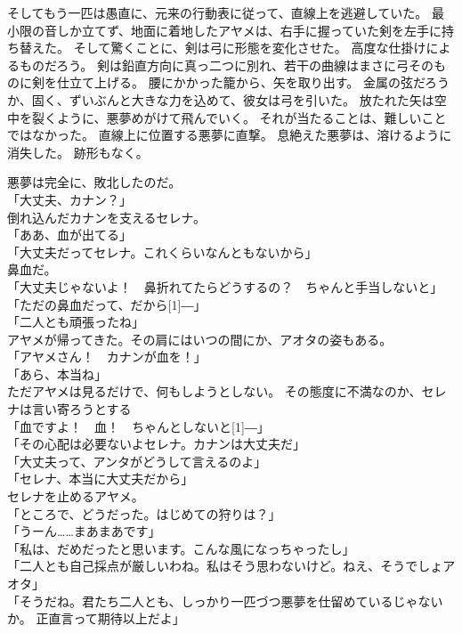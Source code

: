 \documentclass[../IHMain]{subfiles}
\begin{document}
そしてもう一匹は愚直に、元来の行動表に従って、直線上を逃避していた。
最小限の音しか立てず、地面に着地したアヤメは、右手に握っていた剣を左手に持ち替えた。
そして驚くことに、剣は弓に形態を変化させた。
高度な仕掛けによるものだろう。
剣は鉛直方向に真っ二つに別れ、若干の曲線はまさに弓そのものに剣を仕立て上げる。
腰にかかった籠から、矢を取り出す。
金属の弦だろうか、固く、ずいぶんと大きな力を込めて、彼女は弓を引いた。
放たれた矢は空中を裂くように、悪夢めがけて飛んでいく。
それが当たることは、難しいことではなかった。
直線上に位置する悪夢に直撃。
息絶えた悪夢は、溶けるように消失した。
跡形もなく。

悪夢は完全に、敗北したのだ。\\

「大丈夫、カナン？」\\
倒れ込んだカナンを支えるセレナ。\\
「ああ、血が出てる」\\
「大丈夫だってセレナ。これくらいなんともないから」\\
鼻血だ。\\
「大丈夫じゃないよ！　鼻折れてたらどうするの？　ちゃんと手当しないと」\\
「ただの鼻血だって、だから\scalebox{3}[1]{―}」\\
「二人とも頑張ったね」\\
アヤメが帰ってきた。その肩にはいつの間にか、アオタの姿もある。\\
「アヤメさん！　カナンが血を！」\\
「あら、本当ね」\\
ただアヤメは見るだけで、何もしようとしない。
その態度に不満なのか、セレナは言い寄ろうとする\\
「血ですよ！　血！　ちゃんとしないと\scalebox{3}[1]{―}」\\
「その心配は必要ないよセレナ。カナンは大丈夫だ」\\
「大丈夫って、アンタがどうして言えるのよ」\\
「セレナ、本当に大丈夫だから」\\
セレナを止めるアヤメ。\\
「ところで、どうだった。はじめての狩りは？」\\
「うーん……まあまあです」\\
「私は、だめだったと思います。こんな風になっちゃったし」\\
「二人とも自己採点が厳しいわね。私はそう思わないけど。ねえ、そうでしょアオタ」\\
「そうだね。君たち二人とも、しっかり一匹づつ悪夢を仕留めているじゃないか。
正直言って期待以上だよ」\\
\end{document}
